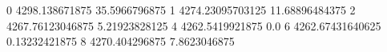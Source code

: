 0 4298.138671875 35.5966796875
1 4274.23095703125 11.68896484375
2 4267.76123046875 5.21923828125
4 4262.5419921875 0.0
6 4262.67431640625 0.13232421875
8 4270.404296875 7.8623046875

